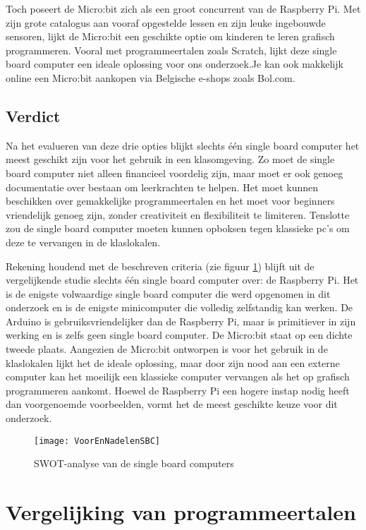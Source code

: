 Toch poseert de Micro:bit zich als een groot concurrent van de Raspberry Pi. Met zijn grote catalogus aan vooraf opgestelde lessen en zijn leuke ingebouwde sensoren, lijkt de Micro:bit een geschikte optie om kinderen te leren grafisch programmeren. Vooral met programmeertalen zoals Scratch, lijkt deze single board computer een ideale oplossing voor ons onderzoek.Je kan ook makkelijk online een Micro:bit aankopen via Belgische e-shops zoals Bol.com. 

\subsection{Verdict}

Na het evalueren van deze drie opties blijkt slechts één single board computer het meest geschikt zijn voor het gebruik in een klasomgeving. Zo moet de single board computer niet alleen financieel voordelig zijn, maar moet er ook genoeg documentatie over bestaan om leerkrachten te helpen. Het moet kunnen beschikken over gemakkelijke programmeertalen en het moet voor beginners vriendelijk genoeg zijn, zonder creativiteit en flexibiliteit te limiteren.
Tenslotte zou de single board computer moeten kunnen opboksen tegen klassieke pc’s om deze te vervangen in de klaslokalen.

Rekening houdend met de beschreven criteria (zie figuur \ref{fig:swotsbc}) blijft uit de vergelijkende studie slechts één single board computer over: de Raspberry Pi. Het is de enigste volwaardige single board computer die werd opgenomen in dit onderzoek en is de enigste minicomputer die volledig zelfstandig kan werken. De Arduino is gebruiksvriendelijker dan de Raspberry Pi, maar is primitiever in zijn werking en is zelfs geen single board computer. De Micro:bit staat op een dichte tweede plaats. Aangezien de Micro:bit ontworpen is voor het gebruik in de klaslokalen lijkt het de ideale oplossing, maar door zijn nood aan een externe computer kan het moeilijk een klassieke computer vervangen als het op grafisch programmeren aankomt. Hoewel de Raspberry Pi een hogere instap nodig heeft dan voorgenoemde voorbeelden, vormt het de meest geschikte keuze voor dit onderzoek.


\begin{figure}
    \texttt{[image: VoorEnNadelenSBC]}
    \caption{SWOT-analyse van de single board computers}
    \label{fig:swotsbc}
\end{figure}

\section{Vergelijking van programmeertalen}

